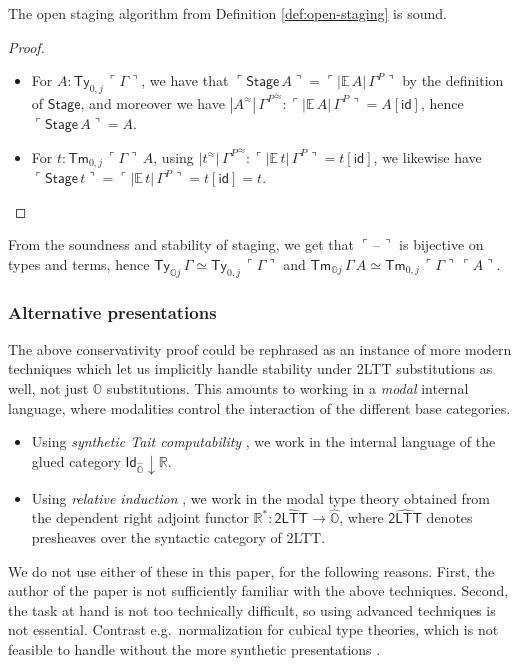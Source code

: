 \documentclass[acmsmall,anonymous,review]{acmart}
\newcommand{\msf}[1]{\mathsf{#1}}
\newcommand{\mbb}[1]{\mathbb{#1}}
\newcommand{\wh}[1]{\widehat{#1}}
\newcommand{\mbbo}{\mbb{O}}
\newcommand{\Ty}{\msf{Ty}}
\newcommand{\Tm}{\msf{Tm}}
\newcommand{\id}{\msf{id}}
\newcommand{\blank}{{\mathord{\hspace{1pt}\text{--}\hspace{1pt}}}}
\newcommand{\emb}[1]{\ulcorner#1\urcorner}
\newcommand{\Stage}{\msf{Stage}}
\newcommand{\hato}{\bm\hat{\mbbo}}
\newcommand{\ev}{\mbb{E}}
\newcommand{\re}{\mbb{R}}
\theoremstyle{remark}
\newcommand{\rel}{^{\approx}}
\begin{document}
\begin{theorem}
The open staging algorithm from Definition \ref{def:open-staging} is sound.
\end{theorem}
\begin{proof}
\mbox{}
\begin{itemize}
\item For $A : \Ty_{0,j}\,\emb{\Gamma}$, we have that $\emb{\Stage\,A} =
\emb{|\ev\,A|\,\Gamma^P}$ by the definition of $\Stage$, and moreover we have
$|A\rel|\,{\Gamma^P}\rel : \emb{|\ev\,A|\,\Gamma^P} = A[\id]$, hence $\emb{\Stage\,A} = A$.

\item For $t : \Tm_{0,j}\,\emb{\Gamma}\,A$, using $|t\rel|\,{\Gamma^P}\rel : \emb{|\ev\,t|\,\Gamma^P} = t[\id]$, we likewise
  have $\emb{\Stage\,t} = \emb{|\ev\,t|\,\Gamma^P} = t[\id] = t$.
\end{itemize}
\end{proof}

\begin{corollary}\label{conservativity}
From the soundness and stability of staging, we get that $\emb{\blank}$ is
bijective on types and terms, hence $\Ty_{\mbbo j}\,\Gamma \simeq \Ty_{0,j}\,\emb{\Gamma}$ and
$\Tm_{\mbbo j}\,\Gamma\,A \simeq \Tm_{0,j}\,\emb{\Gamma}\,\emb{A}$.
\end{corollary}

\subsubsection{Alternative presentations}
The above conservativity proof could be rephrased as an instance of more modern
techniques which let us implicitly handle stability under 2LTT substitutions as
well, not just $\mbbo$ substitutions. This amounts to working in a \emph{modal}
internal language, where modalities control the interaction of the different base
categories.
\begin{itemize}
\item Using \emph{synthetic Tait computability} \cite{sterlingthesis}, we work
      in the internal language of the glued category $\msf{Id}_{\hato}\downarrow
      \re$.
\item Using \emph{relative induction} \cite{bocquet2021relative}, we work in the modal type theory
      obtained from the dependent right adjoint functor $\re^* : \wh{\msf{2LTT}} \to \hato$,
      where $\wh{\msf{2LTT}}$ denotes presheaves over the syntactic category of 2LTT.
\end{itemize}
We do not use either of these in this paper, for the following reasons. First,
the author of the paper is not sufficiently familiar with the above
techniques. Second, the task at hand is not too technically difficult, so using
advanced techniques is not essential. Contrast e.g.\ normalization for cubical
type theories, which is not feasible to handle without the more synthetic
presentations \cite{cubicalnbe}.
\end{document}

